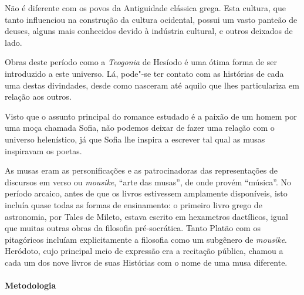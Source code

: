\documentclass[12pt]{extarticle}
\begin{document}

Não é diferente com os povos da Antiguidade clássica grega. Esta cultura, que tanto
influenciou na construção da cultura ocidental, possui um vasto panteão
de deuses, alguns mais conhecidos devido à indústria cultural, e outros
deixados de lado.

Obras deste período como a \textit{Teogonia} de Hesíodo é uma ótima forma de
ser introduzido a este universo. Lá, pode"-se ter contato com as histórias
de cada uma destas divindades, desde como nasceram até aquilo que lhes
particulariza em relação aos outros. 

Visto que o assunto principal do romance estudado é a paixão de um homem por
uma moça chamada Sofia, não podemos deixar de fazer uma relação com o universo 
helenístico, já que Sofia lhe inspira a escrever tal qual as musas inspiravam os
poetas.

As musas eram as personificações e as patrocinadoras das representações de discursos 
em verso ou \textit{mousike}, ``arte das musas'', de onde provém ``música''. No período 
arcaico, antes de que os livros estivessem amplamente disponíveis, isto incluía quase 
todas as formas de ensinamento: o primeiro livro grego de astronomia, por Tales de Mileto, 
estava escrito em hexametros dactílicos, igual que muitas outras obras da filosofia pré-socrática. 
Tanto Platão com os pitagóricos incluíam explicitamente a filosofia como um subgênero de 
\emph{mousike}. Heródoto, cujo principal meio de expressão era a recitação pública, chamou 
a cada um dos nove livros de suas Histórias com o nome de uma musa diferente.

\paragraph{Metodologia}
\end{document}
